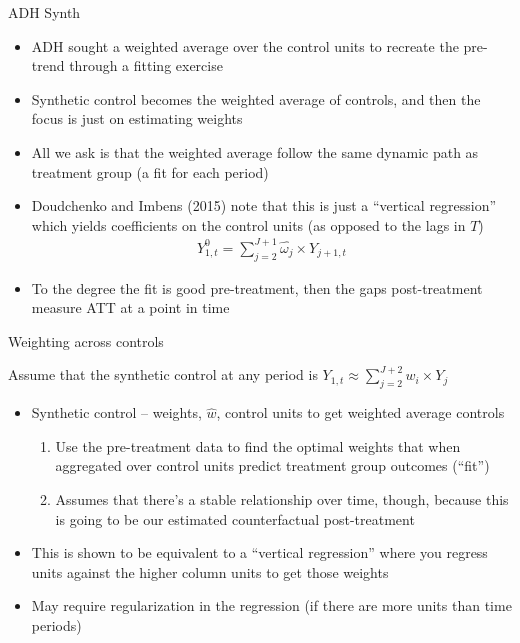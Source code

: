 \documentclass{beamer}
\begin{document}
\begin{frame}{ADH Synth}

\begin{itemize}
\item ADH sought a weighted average over the control units to recreate the pre-trend through a fitting exercise
\item Synthetic control becomes the weighted average of controls, and then the focus is just on estimating weights
\item All we ask is that the weighted average follow the same dynamic path as treatment group (a fit for each period)
\item Doudchenko and Imbens (2015) note that this is just a ``vertical regression'' which yields coefficients on the control units (as opposed to the lags in $T$)
\begin{eqnarray*}
Y^0_{1,t} = \sum_{j=2}^{J+1} \widehat{\omega_j} \times Y_{j+1,t}
\end{eqnarray*}
\item To the degree the fit is good pre-treatment, then the gaps post-treatment measure ATT at a point in time

\end{itemize}

\end{frame}

\begin{frame}{Weighting across controls}

Assume that the synthetic control at any period is $Y_{1,t} \approx \sum_{j=2}^{J+2} w_i \times Y_{j}$
\begin{itemize}
\item Synthetic control -- weights, $\widehat{w}$, control units to get weighted average controls
	\begin{enumerate}
	\item Use the pre-treatment data to find the optimal weights that when aggregated over control units predict treatment group outcomes (``fit'')
	\item Assumes that there's a stable relationship over time, though, because this is going to be our estimated counterfactual post-treatment
	\end{enumerate}
\item This is shown to be equivalent to a ``vertical regression'' where you regress units against the higher column units to get those weights
\item May require regularization in the regression (if there are more units than time periods)
\end{itemize}

\end{frame}
\end{document}
